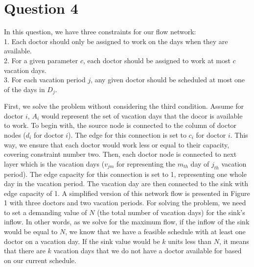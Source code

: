 \section{Question 4}

In this question, we have three constraints for our flow network:
\\ 1. Each doctor should only be assigned to work on the days when they are available.
\\ 2. For a given parameter $c$, each doctor should be assigned to work at most $c$ vacation days.
\\ 3. For each vacation period $j$, any given doctor should be scheduled at most one of the days in $D_j$. 

First, we solve the problem without considering the third condition. Assume for doctor $i$, $A_i$ would represent
the set of vacation days that the docor is available to work. To begin with, the source node is connected to the column
of doctor nodes ($d_i$ for doctor $i$). The edge for this connection is set to $c_i$ for doctor $i$. This way, we ensure that each doctor
would work less or equal to their capacity, covering constraint number two. Then, each doctor node is connected to next layer which is the vacation
days ($v_{jm}$ for representing the $m_{th}$ day of $j_{th}$ vacation period). The edge capacity for this connection is set to 1, representing one whole day in the vacation period.
The vacation day are then connected to the sink with edge capacity of 1. A simplified version of this network flow is presented in Figure 1 with three doctors 
and two vacation periods. For solving the problem, we need to set a demanding value of $N$ (the total number of vacation days) for the sink's inflow. In other words, as we solve for the
maximum flow, if the inflow of the sink would be equal to $N$, we know that we have a feasible schedule with at least one doctor on a vacation day. If the sink value would be $k$ units less than $N$, it means
that there are $k$ vacation days that we do not have a doctor available for based on our current schedule. 

